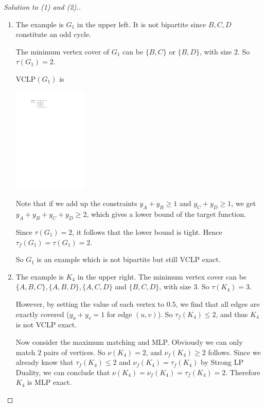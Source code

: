     \begin{proof}[Solution to (1) and (2).]
        ~
        \begin{enumerate}
            \item The example is $G_1$ in the upper left. It is not bipartite since $B, C, D$ constitute an odd cycle.
            
            The minimum vertex cover of $G_1$ can be $\{B, C\}$ or $\{B, D\}$, with size $2$. So $\tau(G_1) = 2$.
            
            VCLP$(G_1)$ is
            \begin{center}
                \includegraphics[width=0.28\textwidth]{VCLP4_1.pdf}
            \end{center}
            Note that if we add up the constraints $y_A + y_B \geq 1$ and $y_C + y_D \geq 1$, we get $y_A + y_B + y_C + y_D \geq 2$, which gives a lower bound of the target function.
            
            Since $\tau(G_1) = 2$, it follows that the lower bound is tight. Hence $\tau_f(G_1) = \tau(G_1) = 2$.
            
            So $G_1$ is an example which is not bipartite but still VCLP exact.
            
            \item The example is $K_4$ in the upper right. The minimum vertex cover can be $\{A, B, C\}, \{A, B, D\}, \{A, C, D\}$ and $\{B, C, D\}$, with size $3$. So $\tau(K_4) = 3$.
            
            However, by setting the value of each vertex to $0.5$, we find that all edges are exactly covered ($y_u + y_v = 1$ for edge $(u, v)$). So $\tau_f(K_4) \leq 2$, and thus $K_4$ is not VCLP exact.
            
            Now consider the maximum matching and MLP. Obviously we can only match $2$ pairs of vertices. So $\nu(K_4) = 2$, and $\nu_f(K_4) \geq 2$ follows. Since we already know that $\tau_f(K_4) \leq 2$ and $\nu_f(K_4) = \tau_f(K_4)$ by Strong LP Duality, we can conclude that $\nu(K_4) = \nu_f(K_4) = \tau_f(K_4) = 2$. Therefore $K_4$ is MLP exact.
            

\end{enumerate}
\end{proof}
